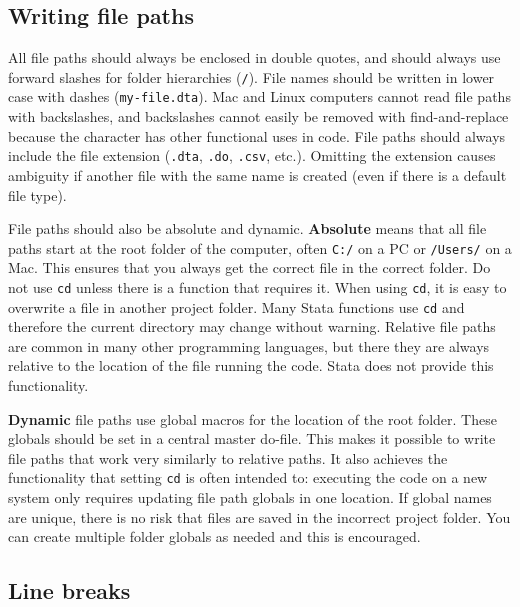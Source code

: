 
\subsection{Writing file paths}

All file paths should always be enclosed in double quotes,
and should always use forward slashes for folder hierarchies (\texttt{/}).
File names should be written in lower case with dashes (\texttt{my-file.dta}).
Mac and Linux computers cannot read file paths with backslashes,
and backslashes cannot easily be removed with find-and-replace
because the character has other functional uses in code.
File paths should always include the file extension
(\texttt{.dta}, \texttt{.do}, \texttt{.csv}, etc.).
Omitting the extension causes ambiguity
if another file with the same name is created
(even if there is a default file type).

File paths should also be absolute and dynamic.
\textbf{Absolute} means that all
file paths start at the root folder of the computer,
often \texttt{C:/} on a PC or \texttt{/Users/} on a Mac.
This ensures that you always get the correct file in the correct folder.
Do not use \texttt{cd} unless there is a function that requires it.
When using \texttt{cd}, it is easy to overwrite a file in another project folder.
Many Stata functions use \texttt{cd} and therefore the current directory may change without warning.
Relative file paths are common in many other programming languages,
but there they are always relative to the location of the file running the code.
Stata does not provide this functionality.

\textbf{Dynamic} file paths use global macros for the location of the root folder.
These globals should be set in a central master do-file.
This makes it possible to write file paths that work very similarly to relative paths.
It also achieves the functionality that setting \texttt{cd} is often intended to:
executing the code on a new system only requires updating file path globals in one location.
If global names are unique, there is no risk that files are saved in the incorrect project folder.
You can create multiple folder globals as needed and this is encouraged.


\subsection{Line breaks}

